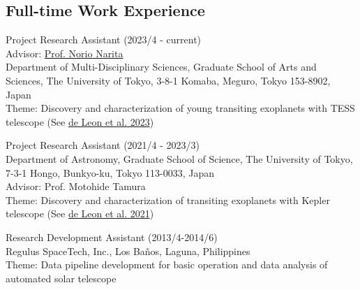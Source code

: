 \documentclass[12pt,letterpaper]{article}
\begin{document}
\subsection{Full-time Work Experience}
\begin{list}{}{\cvlist}
    \item Project Research Assistant (2023/4 - current)\\
        Advisor: \href{https://www.u-tokyo.ac.jp/focus/en/people/k0001_00784.html}{Prof. Norio Narita}\\
        Department of Multi-Disciplinary Sciences, Graduate School of Arts and Sciences, The University of Tokyo, 3-8-1 Komaba, Meguro, Tokyo 153-8902, Japan\\
        Theme: Discovery and characterization of young transiting exoplanets with TESS telescope (See \href{\paperthree}{de Leon et al. 2023})\\
    \item Project Research Assistant (2021/4 - 2023/3)\\
        Department of Astronomy, Graduate School of Science, The University of Tokyo, 7-3-1 Hongo, Bunkyo-ku, Tokyo 113-0033, Japan\\
        Advisor: Prof. Motohide Tamura\\
        Theme: Discovery and characterization of transiting exoplanets with Kepler telescope (See \href{\papertwo}{de Leon et al. 2021})\\
    \item Research Development Assistant (2013/4-2014/6)\\
        Regulus SpaceTech, Inc., Los Ba\~nos, Laguna, Philippines\\
        Theme: Data pipeline development for basic operation and data analysis of automated solar telescope
\end{list}
\end{document}
